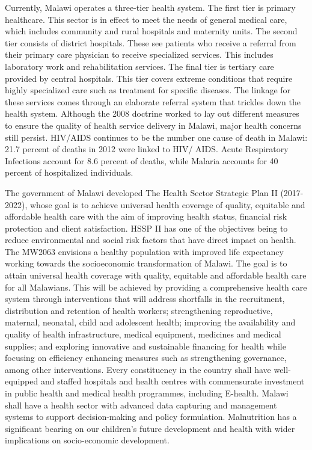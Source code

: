 \documentclass[
]{book}
\begin{document}
Currently, Malawi operates a three-tier health system. The first tier is primary healthcare. This sector is in effect to meet the needs of general medical care, which includes community and rural hospitals and maternity units. The second tier consists of district hospitals. These see patients who receive a referral from their primary care physician to receive specialized services. This includes laboratory work and rehabilitation services. The final tier is tertiary care provided by central hospitals. This tier covers extreme conditions that require highly specialized care such as treatment for specific diseases. The linkage for these services comes through an elaborate referral system that trickles down the health system. Although the 2008 doctrine worked to lay out different measures to ensure the quality of health service delivery in Malawi, major health concerns still persist. HIV/AIDS continues to be the number one cause of death in Malawi: 21.7 percent of deaths in 2012 were linked to HIV/ AIDS. Acute Respiratory Infections account for 8.6 percent of deaths, while Malaria accounts for 40 percent of hospitalized individuals.

The government of Malawi developed The Health Sector Strategic Plan II (2017-2022), whose goal is to achieve universal health coverage of quality, equitable and affordable health care with the aim of improving health status, financial risk protection and client satisfaction. HSSP II has one of the objectives being to reduce environmental and social risk factors that have direct impact on health. The MW2063 envisions a healthy population with improved life expectancy working towards the socioeconomic transformation of Malawi. The goal is to attain universal health coverage with quality, equitable and affordable health care for all Malawians. This will be achieved by providing a comprehensive health care system through interventions that will address shortfalls in the recruitment, distribution and retention of health workers; strengthening reproductive, maternal, neonatal, child and adolescent health; improving the availability and quality of health infrastructure, medical equipment, medicines and medical supplies; and exploring innovative and sustainable financing for health while focusing on efficiency enhancing measures such as strengthening governance, among other interventions. Every constituency in the country shall have well-equipped and staffed hospitals and health centres with commensurate investment in public health and medical health programmes, including E-health. Malawi shall have a health sector with advanced data capturing and management systems to support decision-making and policy formulation. Malnutrition has a significant bearing on our children's future development and health with wider implications on socio-economic development.
\end{document}
